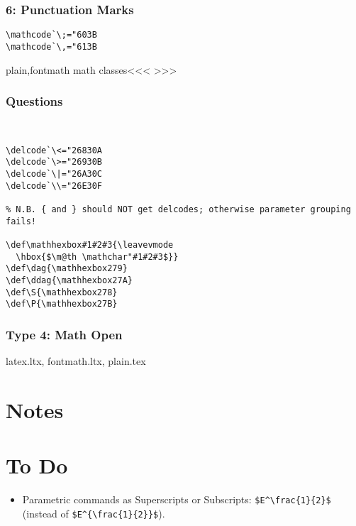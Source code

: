 {{\subsection{6: Punctuation Marks}

\begin{verbatim}
\mathcode`\;="603B
\mathcode`\,="613B
\end{verbatim}

\<plain,fontmath math classes\><<<
>>>


\subsection{Questions}

\begin{verbatim}


\delcode`\<="26830A
\delcode`\>="26930B
\delcode`\|="26A30C
\delcode`\\="26E30F

% N.B. { and } should NOT get delcodes; otherwise parameter grouping fails!

\def\mathhexbox#1#2#3{\leavevmode
  \hbox{$\m@th \mathchar"#1#2#3$}}
\def\dag{\mathhexbox279}
\def\ddag{\mathhexbox27A}
\def\S{\mathhexbox278}
\def\P{\mathhexbox27B}
\end{verbatim}


\subsection{Type 4: Math Open}


latex.ltx, fontmath.ltx, plain.tex


\chapter{Notes}

\chapter{To Do}

\begin{itemize}
\item Parametric commands as Superscripts or Subscripts:
    \verb+$E^\frac{1}{2}$+  (instead of \verb+$E^{\frac{1}{2}}$+).


\end{itemize}}}
